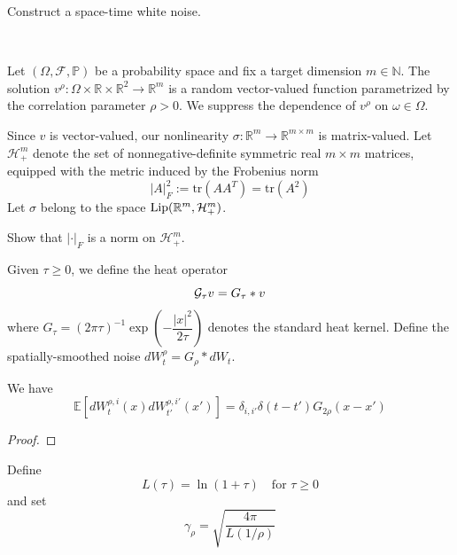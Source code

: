 \begin{proposition}
    Construct a space-time white noise.
\end{proposition}

\begin{definition}\ \par
    Let $(\Omega,\mathcal{F},\mathbb{P})$ be a probability space and fix a target dimension $m\in\mathbb{N}$. The solution $v^{\rho}:\Omega\times\mathbb{R}\times\mathbb{R}^2 \to \mathbb{R}^m$ is a random vector-valued function parametrized by the correlation parameter $\rho > 0$. We suppress the dependence of $v^{\rho}$ on $\omega \in \Omega$.\par
    Since $v$ is vector-valued, our nonlinearity $\sigma: \mathbb{R}^m \to \mathbb{R}^{m\times m}$ is matrix-valued. Let $\mathcal{H}^m_+$ denote the set of nonnegative-definite symmetric real $m\times m$ matrices, equipped with the metric induced by the Frobenius norm
    \[
    |A|^2_F := \text{tr}(AA^T) = \text{tr}(A^2)
    \]
    Let $\sigma$ belong to the space $\text{Lip}(\mathbb{R}^m, \mathcal{H}^m_+)$.
\end{definition}

\begin{proposition}
    Show that $|\cdot|_F$ is a norm on $\mathcal{H}_+^m$.
\end{proposition}

\begin{definition}
    Given $\tau \geq 0$, we define the heat operator
    \[
    \mathcal{G}_{\tau} v = G_{\tau} * v
    \]
    where $G_{\tau} = (2\pi\tau)^{-1}\exp{(-\dfrac{|x|^2}{2\tau})}$ denotes the standard heat kernel. Define the spatially-smoothed noise $dW_t^{\rho} = G_{\rho} * dW_t$.
\end{definition}

\begin{proposition}
    We have
    \[\mathbb{E}[dW_t^{\rho,i}(x)dW_{t'}^{\rho,i'}(x')] = \delta_{i,i'}\delta(t-t')G_{2\rho}(x-x')\]
\end{proposition}
\begin{proof}
    
\end{proof}

\begin{definition}
    Define
    \[L(\tau) = \ln (1+\tau)\quad\text{for }\tau\geq 0\]
    and set
    \[\gamma_{\rho} = \sqrt{\dfrac{4\pi}{L(1/\rho)}}\]
\end{definition}

